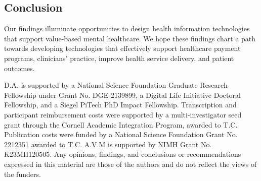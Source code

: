 \subsection{Conclusion}

Our findings illuminate opportunities to design health information technologies that support value-based mental healthcare.
We hope these findings chart a path towards developing technologies that effectively support healthcare payment programs, clinicians' practice, improve health service delivery, and patient outcomes.

\begin{acks}
D.A. is supported by a National Science Foundation Graduate Research Fellowship under Grant No. DGE-2139899, a Digital Life Initiative Doctoral Fellowship, and a Siegel PiTech PhD Impact Fellowship.
Transcription and participant reimbursement costs were supported by a multi-investigator seed grant through the Cornell Academic Integration Program, awarded to T.C.
Publication costs were funded by a National Science Foundation Grant No. 2212351 awarded to T.C.
A.V.M is supported by NIMH Grant No. K23MH120505.
Any opinions, findings, and conclusions or recommendations expressed in this material are those of the authors and do not reflect the views of the funders.
\end{acks}